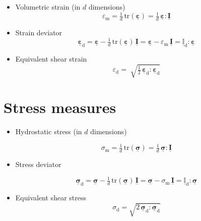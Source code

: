 \documentclass[fleqn]{goose-article}
\newcommand\T[1]{\underline{\bm{{#1}}}}
\newcommand\TT[1]{\underline{\mathbb{{#1}}}}
\begin{document}
\begin{itemize}

    \item Volumetric strain (in $d$ dimensions)
    \begin{equation}
        \varepsilon_\mathrm{m}
        = \tfrac{1}{d} \, \mathrm{tr} ( \T{\varepsilon} )
        = \tfrac{1}{d} \, \T{\varepsilon} : \T{I}
    \end{equation}

    \item Strain deviator
    \begin{equation}
        \T{\varepsilon}_\mathrm{d}
        = \T{\varepsilon} - \tfrac{1}{d} \, \mathrm{tr} ( \T{\varepsilon} ) \, \T{I}
        = \T{\varepsilon} - \varepsilon_\mathrm{m} \, \T{I}
        = \TT{I}_\mathrm{d} : \T{\varepsilon}
    \end{equation}

    \item Equivalent shear strain
    \begin{equation}
        \varepsilon_\mathrm{d}
        = \; \sqrt{
          \tfrac{1}{2} \, \T{\varepsilon}_\mathrm{d} : \T{\varepsilon}_\mathrm{d}
        }
    \end{equation}

\end{itemize}

\section{Stress measures}
\label{sec:nomenclature::stress}

\begin{itemize}

    \item Hydrostatic stress (in $d$ dimensions)

    \begin{equation}
        \sigma_\mathrm{m}
        = \tfrac{1}{d} \, \mathrm{tr} ( \T{\sigma} )
        = \tfrac{1}{d} \, \T{\sigma} : \T{I}
    \end{equation}

    \item Stress deviator

    \begin{equation}
        \T{\sigma}_\mathrm{d}
        = \T{\sigma} - \tfrac{1}{d} \, \mathrm{tr} ( \T{\sigma} ) \, \T{I}
        = \T{\sigma} - \sigma_\mathrm{m} \, \T{I}
        = \TT{I}_\mathrm{d} : \T{\sigma}
    \end{equation}

    \item Equivalent shear stress
    \begin{equation}
        \sigma_\mathrm{d} = \sqrt{ 2 \, \T{\sigma}_\mathrm{d} : \T{\sigma}_\mathrm{d} }
    \end{equation}

\end{itemize}
\end{document}
